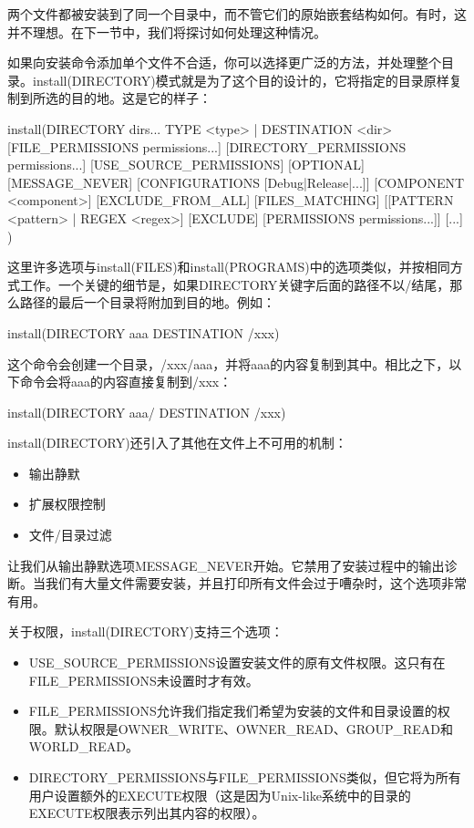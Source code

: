 两个文件都被安装到了同一个目录中，而不管它们的原始嵌套结构如何。有时，这并不理想。在下一节中，我们将探讨如何处理这种情况。


如果向安装命令添加单个文件不合适，你可以选择更广泛的方法，并处理整个目录。install(DIRECTORY)模式就是为了这个目的设计的，它将指定的目录原样复制到所选的目的地。这是它的样子：

\begin{shell}
install(DIRECTORY dirs...
        TYPE <type> | DESTINATION <dir>
        [FILE_PERMISSIONS permissions...]
        [DIRECTORY_PERMISSIONS permissions...]
        [USE_SOURCE_PERMISSIONS] [OPTIONAL] [MESSAGE_NEVER]
        [CONFIGURATIONS [Debug|Release|...]]
        [COMPONENT <component>] [EXCLUDE_FROM_ALL]
        [FILES_MATCHING]
        [[PATTERN <pattern> | REGEX <regex>] [EXCLUDE]
        [PERMISSIONS permissions...]] [...]
)
\end{shell}

这里许多选项与install(FILES)和install(PROGRAMS)中的选项类似，并按相同方式工作。一个关键的细节是，如果DIRECTORY关键字后面的路径不以/结尾，那么路径的最后一个目录将附加到目的地。例如：

\begin{cmake}
install(DIRECTORY aaa DESTINATION /xxx)
\end{cmake}

这个命令会创建一个目录，/xxx/aaa，并将aaa的内容复制到其中。相比之下，以下命令会将aaa的内容直接复制到/xxx：

\begin{cmake}
install(DIRECTORY aaa/ DESTINATION /xxx)
\end{cmake}

install(DIRECTORY)还引入了其他在文件上不可用的机制：

\begin{itemize}
\item
输出静默

\item
扩展权限控制

\item
文件/目录过滤
\end{itemize}

让我们从输出静默选项MESSAGE\_NEVER开始。它禁用了安装过程中的输出诊断。当我们有大量文件需要安装，并且打印所有文件会过于嘈杂时，这个选项非常有用。

关于权限，install(DIRECTORY)支持三个选项：

\begin{itemize}
\item
USE\_SOURCE\_PERMISSIONS设置安装文件的原有文件权限。这只有在FILE\_PERMISSIONS未设置时才有效。

\item
FILE\_PERMISSIONS允许我们指定我们希望为安装的文件和目录设置的权限。默认权限是OWNER\_WRITE、OWNER\_READ、GROUP\_READ和WORLD\_READ。

\item
DIRECTORY\_PERMISSIONS与FILE\_PERMISSIONS类似，但它将为所有用户设置额外的EXECUTE权限（这是因为Unix-like系统中的目录的EXECUTE权限表示列出其内容的权限）。
\end{itemize}

